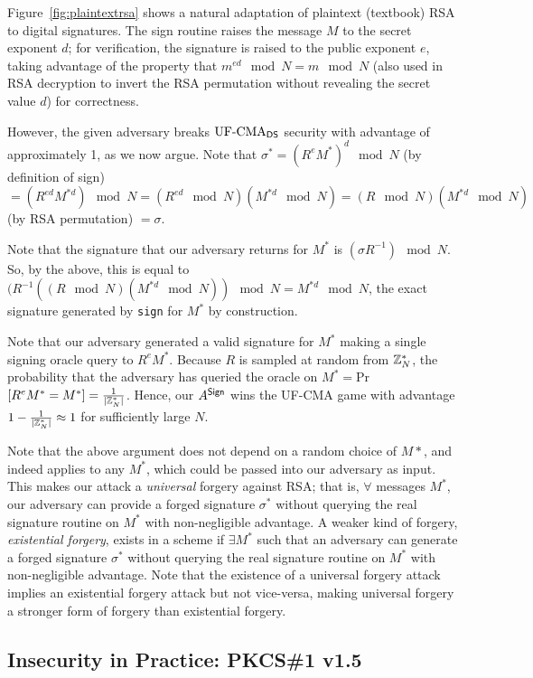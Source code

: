 Figure~\ref{fig:plaintextrsa} shows a natural adaptation of plaintext (textbook) RSA to digital signatures.  The sign routine raises the message $M$ to the secret exponent $d$; for verification, the signature is raised to the public exponent $e$, taking advantage of the property that $m^{ed}\mod N=m\mod N$ (also used in RSA decryption to invert the RSA permutation without revealing the secret value $d$) for correctness.

However, the given adversary breaks $\textnormal{UF-CMA}_{{\mathsf{DS}}}$ security with advantage of approximately 1, as we now argue.  Note that $\sigma^* = (R^e M^*)^d\mod N$ (by definition of sign) $ = (R^{ed} M^{*d})\mod N = (R^{ed}\mod N) (M^{*d}\mod N) = (R\mod N) (M^{*d}\mod N)$ (by RSA permutation) $ = \sigma$.

Note that the signature that our adversary returns for $M^*$ is $(\sigma R^{-1})\mod N$.  So, by the above, this is equal to $(R^{-1} ((R\mod N) (M^{*d}\mod N))\mod N = M^{*d}\mod N$, the exact signature generated by \texttt{sign} for $M^*$ by construction.

Note that our adversary generated a valid signature for $M^*$ making a single signing oracle query to $R^e M^*$.  Because $R$ is sampled at random from ${{\mathbb Z}}^*_N$, the probability that the adversary has queried the oracle on $M^* = $Pr$[R^e M^*=M^*] = \frac{1}{|{{\mathbb Z}}^*_N|}$.  Hence, our $A^{\textsf{Sign}}$ wins the UF-CMA game with advantage $1 - \frac{1}{|{{\mathbb Z}}^*_N|} \approx 1$ for sufficiently large $N$.

Note that the above argument does not depend on a random choice of $M*$, and indeed applies to any $M^*$, which could be passed into our adversary as input.  This makes our attack a \emph{universal} forgery against RSA; that is, $\forall$ messages $M^*$, our adversary can provide a forged signature $\sigma^*$ without querying the real signature routine on $M^*$ with non-negligible advantage.  A weaker kind of forgery, \emph{existential forgery}, exists in a scheme if $\exists M^*$ such that an adversary can generate a forged signature $\sigma^*$ without querying the real signature routine on $M^*$ with non-negligible advantage.  Note that the existence of a universal forgery attack implies an existential forgery attack but not vice-versa, making universal forgery a stronger form of forgery than existential forgery.

\subsection{Insecurity in Practice: PKCS\#1 v1.5}


